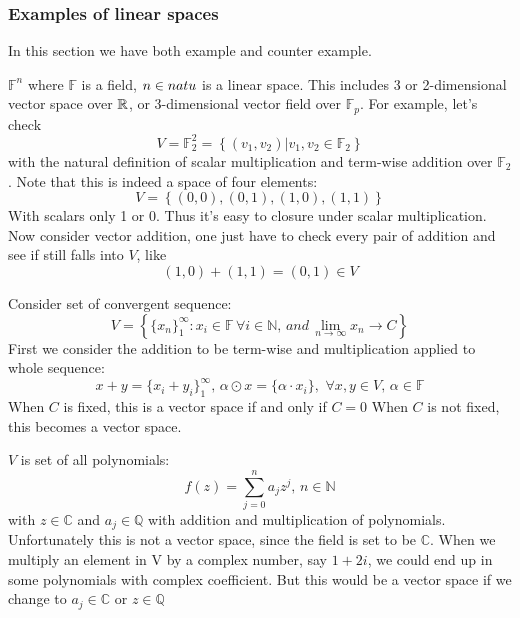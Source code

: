 \documentclass{article}
\begin{document}
\subsubsection{Examples of linear spaces}
In this section we have both example and counter example.
\begin{example}\rm\nextline
	$\mathbb{F}^n$ where $\mathbb{F}$ is a field, $n\in\\natu$ is a linear space. This includes 3 or 2-dimensional vector space over $\mathbb{R}$, or 3-dimensional vector field over $\mathbb{F}_p$. For example, let's check
	$$
		V=\mathbb{F}_2^2=\left\{(v_1,v_2)|v_1,v_2\in\mathbb{F}_2\right\}
	$$
	with the natural definition of scalar multiplication and term-wise addition over $\mathbb{F}_2$. Note that this is indeed a space of four elements:
	$$
		V=\left\{(0,0),(0,1),(1,0),(1,1)\right\}
	$$
	With scalars only 1 or 0. Thus it's easy to closure under scalar multiplication. Now consider vector addition, one just have to check every pair of addition and see if still falls into $V$, like
	$$
		(1,0)+(1,1)=(0,1)\in V
	$$
\end{example}
\begin{example}\rm\nextline
	Consider set of convergent sequence:
	$$
		V=\left\{\{x_n\}_1^\infty:x_i\in\mathbb{F}\,\forall i\in\mathbb{N},\,and\, \lim_{n\to \infty}x_n\to C\right\}
	$$
	First we consider the addition to be term-wise and multiplication applied to whole sequence:
	$$
		x+y=\{x_i+y_i\}_1^\infty,\,\alpha\odot x=\{\alpha\cdot x_i\},\,\,\forall x,y\in V,\,\alpha\in\mathbb{F}
	$$
	When $C$ is fixed, this is a vector space if and only if $C=0$
	When $C$ is not fixed, this becomes a vector space.
\end{example}

\begin{example}[Polynomials]\rm\nextline
	$V$ is set of all polynomials:
	$$
		f(z)=\sum_{j=0}^{n}a_jz^j,\,n\in\mathbb{N}
	$$
	with $z\in\mathbb{C}$ and $a_j\in{\mathbb{Q}}$ with addition and multiplication of polynomials. Unfortunately this is not a vector space, since the field is set to be $\mathbb{C}$. When we multiply an element in V by a complex number, say $1+2i$, we could end up in some polynomials with complex coefficient. But this would be a vector space if we change to $a_j\in \mathbb{C}$ or $z\in\mathbb{Q}$
\end{example}
\end{document}
